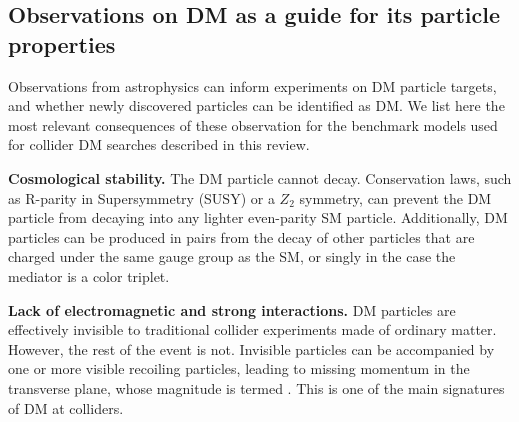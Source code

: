 \begin{textbox}[!h]
\section{Observations on DM as a guide for its particle properties}

Observations from astrophysics can inform experiments on DM particle targets, and whether newly discovered particles can be identified as DM. 
We list here the most relevant consequences of these observation for the benchmark models used for collider DM searches described in this review. 

\textbf{Cosmological stability.}
The DM particle cannot decay. Conservation laws, such as R-parity in Supersymmetry (SUSY) or a $Z_2$ symmetry, can prevent the DM particle from decaying into any lighter even-parity SM particle. Additionally, DM particles can be produced in pairs from the decay of other particles that are charged under the same gauge group as the SM, or singly in the case the mediator is a color triplet. 

\textbf{Lack of electromagnetic and strong interactions.} 
DM particles are effectively invisible to traditional collider experiments made of ordinary matter. However, the rest of the event is not. 
Invisible particles can be accompanied by one or more visible recoiling particles, leading to missing momentum in the transverse plane, whose magnitude is termed \MET. This is one of the main signatures of DM at colliders.

\end{textbox}